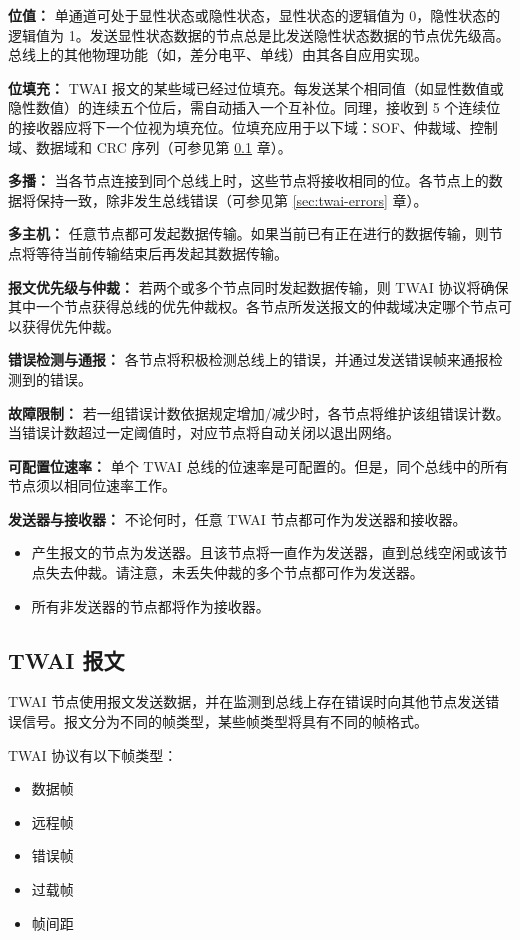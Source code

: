 \documentclass[main\_\_CN.tex]{subfiles}
\begin{document}
{\bfseries 位值：} 单通道可处于显性状态或隐性状态，显性状态的逻辑值为 0，隐性状态的逻辑值为 1。发送显性状态数据的节点总是比发送隐性状态数据的节点优先级高。总线上的其他物理功能（如，差分电平、单线）由其各自应用实现。

{\bfseries 位填充：} TWAI 报文的某些域已经过位填充。每发送某个相同值（如显性数值或隐性数值）的连续五个位后，需自动插入一个互补位。同理，接收到 5 个连续位的接收器应将下一个位视为填充位。位填充应用于以下域：SOF、仲裁域、控制域、数据域和 CRC 序列（可参见第 \ref{sec:twai-messages} 章）。

{\bfseries 多播：} 当各节点连接到同个总线上时，这些节点将接收相同的位。各节点上的数据将保持一致，除非发生总线错误（可参见第 \ref{sec:twai-errors} 章）。

{\bfseries 多主机：} 任意节点都可发起数据传输。如果当前已有正在进行的数据传输，则节点将等待当前传输结束后再发起其数据传输。

{\bfseries 报文优先级与仲裁：} 若两个或多个节点同时发起数据传输，则 TWAI 协议将确保其中一个节点获得总线的优先仲裁权。各节点所发送报文的仲裁域决定哪个节点可以获得优先仲裁。

{\bfseries 错误检测与通报：} 各节点将积极检测总线上的错误，并通过发送错误帧来通报检测到的错误。

{\bfseries 故障限制：} 若一组错误计数依据规定增加/减少时，各节点将维护该组错误计数。当错误计数超过一定阈值时，对应节点将自动关闭以退出网络。

{\bfseries 可配置位速率：} 单个 TWAI 总线的位速率是可配置的。但是，同个总线中的所有节点须以相同位速率工作。

{\bfseries 发送器与接收器：} 不论何时，任意 TWAI 节点都可作为发送器和接收器。
\begin{itemize}
    \item 产生报文的节点为发送器。且该节点将一直作为发送器，直到总线空闲或该节点失去仲裁。请注意，未丢失仲裁的多个节点都可作为发送器。
    \item 所有非发送器的节点都将作为接收器。
\end{itemize}

\subsection{TWAI 报文}
\label{sec:twai-messages}
TWAI 节点使用报文发送数据，并在监测到总线上存在错误时向其他节点发送错误信号。报文分为不同的帧类型，某些帧类型将具有不同的帧格式。

TWAI 协议有以下帧类型：

\begin{itemize}
    \item 数据帧
    \item 远程帧
    \item 错误帧
    \item 过载帧
    \item 帧间距
\end{itemize}
\end{document}
